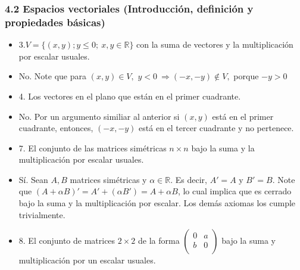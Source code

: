\documentclass[
]{article}
\begin{document}
\hypertarget{espacios-vectoriales-introducciuxf3n-definiciuxf3n-y-propiedades-buxe1sicas}{%
\subsubsection{4.2 Espacios vectoriales (Introducción, definición y
propiedades
básicas)}\label{espacios-vectoriales-introducciuxf3n-definiciuxf3n-y-propiedades-buxe1sicas}}

\begin{itemize}
\item
  3.\(V = \{(x,y);y \leq 0;\ x,y \in \mathbb{R}\}\) con la suma de
  vectores y la multiplicación por escalar usuales.
\end{itemize}

\begin{itemize}
\item
  No. Note que para \((x,y) \in V,\)
  \(y < 0\  \Rightarrow ( - x, - y) \notin V,\) porque \(- y > 0\)
\end{itemize}

\begin{itemize}
\item
  4. Los vectores en el plano que están en el primer cuadrante.
\end{itemize}

\begin{itemize}
\item
  No. Por un argumento similiar al anterior si \((x,y)\) está en el
  primer cuadrante, entonces, \(( - x, - y)\) está en el tercer
  cuadrante y no pertenece.
\end{itemize}

\begin{itemize}
\item
  7. El conjunto de las matrices simétricas \(n \times n\) bajo la suma
  y la multiplicación por escalar usuales.
\end{itemize}

\begin{itemize}
\item
  Sí. Sean \(A,B\) matrices simétricas y \(\alpha \in \mathbb{R}\). Es
  decir, \(A\prime = A\) y \(B\prime = B\). Note que
  \((A + \alpha B)\prime = A\prime + (\alpha B\prime) = A + \alpha B\),
  lo cual implica que es cerrado bajo la suma y la multiplicación por
  escalar. Los demás axiomas los cumple trivialmente.
\end{itemize}

\begin{itemize}
\item
  8. El conjunto de matrices \(2 \times 2\) de la forma
  \(\begin{pmatrix}
  0 & a \\
  b & 0 \\
  \end{pmatrix}\) bajo la suma y multiplicación por un escalar usuales.
\end{itemize}
\end{document}
